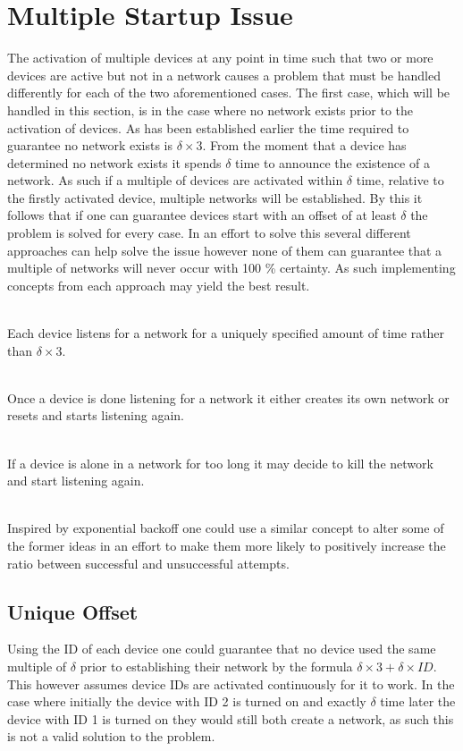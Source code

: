 \section{Multiple Startup Issue}\label{sec:MSI-CCRC}
The activation of multiple devices at any point in time such that two or more devices are active but not in a network causes a problem that must be handled differently for each of the two aforementioned cases.
The first case, which will be handled in this section, is in the case where no network exists prior to the activation of devices.
As has been established earlier the time required to guarantee no network exists is $\delta \times 3$.
From the moment that a device has determined no network exists it spends $\delta$ time to announce the existence of a network.
As such if a multiple of devices are activated within $\delta$ time, relative to the firstly activated device, multiple networks will be established.
By this it follows that if one can guarantee devices start with an offset of at least $\delta$ the problem is solved for every case.
In an effort to solve this several different approaches can help solve the issue however none of them can guarantee that a multiple of networks will never occur with 100 \% certainty. 
As such implementing concepts from each approach may yield the best result.

\begin{description}[labelindent=\parindent]
    \item[Unique Offset]\hfill\\
    Each device listens for a network for a uniquely specified amount of time rather than $\delta \times 3$.
    \item[Randomly Create]\hfill\\
    Once a device is done listening for a network it either creates its own network or resets and starts listening again.
    \item[Kill the Network]\hfill\\
    If a device is alone in a network for too long it may decide to kill the network and start listening again.
    \item[Exponential variables]\hfill\\ 
    Inspired by exponential backoff one could use a similar concept to alter some of the former ideas in an effort to make them more likely to positively increase the ratio between successful and unsuccessful attempts.
\end{description} 

\subsection{Unique Offset}
Using the ID of each device one could guarantee that no device used the same multiple of $\delta$ prior to establishing their network by the formula $\delta \times 3 + \delta \times ID$.
This however assumes device IDs are activated continuously for it to work.
In the case where initially the device with ID 2 is turned on and exactly $\delta$ time later the device with ID 1 is turned on they would still both create a network, as such this is not a valid solution to the problem.

